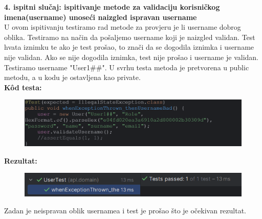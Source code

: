 \noindent \textbf{4. ispitni slučaj: ispitivanje metode za validaciju korisničkog imena(username) unoseći naizgled ispravan username}\\
U ovom ispitivanju testiramo rad metode za provjeru je li username dobrog oblika. Testiramo na način da pošaljemo username koji je naizgled validan. Test hvata iznimku te ako je test prošao, to znači da se dogodila iznimka i username nije validan. Ako se nije dogodila iznimka, test nije prošao i username je validan. Testiramo username "User1\#\#". U svrhu testa metoda je pretvorena u public metodu, a u kodu je ostavljena kao private. \\
\textbf{Kôd testa:}
\begin{figure}[H]
	\includegraphics[scale=0.5]{slike/kodTesta4.PNG} %
	\centering
\end{figure}
\noindent \textbf{Rezultat:}
\begin{figure}[H]
	\includegraphics[scale=0.6]{slike/test4.PNG} %
	\centering
\end{figure}
\noindent Zadan je neispravan oblik usernamea i test je prošao što je očekivan rezultat. \\

